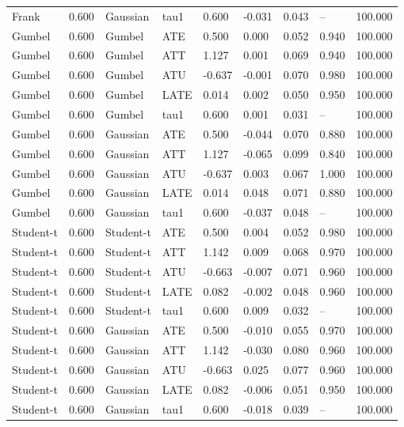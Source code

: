 \begin{table}[htbp]
\begin{tabular}{lllllllll}
Frank & 0.600 & Gaussian & tau1 & 0.600 & -0.031 & 0.043 & -- & 100.000 \\
Gumbel & 0.600 & Gumbel & ATE & 0.500 & 0.000 & 0.052 & 0.940 & 100.000 \\
Gumbel & 0.600 & Gumbel & ATT & 1.127 & 0.001 & 0.069 & 0.940 & 100.000 \\
Gumbel & 0.600 & Gumbel & ATU & -0.637 & -0.001 & 0.070 & 0.980 & 100.000 \\
Gumbel & 0.600 & Gumbel & LATE & 0.014 & 0.002 & 0.050 & 0.950 & 100.000 \\
Gumbel & 0.600 & Gumbel & tau1 & 0.600 & 0.001 & 0.031 & -- & 100.000 \\
Gumbel & 0.600 & Gaussian & ATE & 0.500 & -0.044 & 0.070 & 0.880 & 100.000 \\
Gumbel & 0.600 & Gaussian & ATT & 1.127 & -0.065 & 0.099 & 0.840 & 100.000 \\
Gumbel & 0.600 & Gaussian & ATU & -0.637 & 0.003 & 0.067 & 1.000 & 100.000 \\
Gumbel & 0.600 & Gaussian & LATE & 0.014 & 0.048 & 0.071 & 0.880 & 100.000 \\
Gumbel & 0.600 & Gaussian & tau1 & 0.600 & -0.037 & 0.048 & -- & 100.000 \\
Student-t & 0.600 & Student-t & ATE & 0.500 & 0.004 & 0.052 & 0.980 & 100.000 \\
Student-t & 0.600 & Student-t & ATT & 1.142 & 0.009 & 0.068 & 0.970 & 100.000 \\
Student-t & 0.600 & Student-t & ATU & -0.663 & -0.007 & 0.071 & 0.960 & 100.000 \\
Student-t & 0.600 & Student-t & LATE & 0.082 & -0.002 & 0.048 & 0.960 & 100.000 \\
Student-t & 0.600 & Student-t & tau1 & 0.600 & 0.009 & 0.032 & -- & 100.000 \\
Student-t & 0.600 & Gaussian & ATE & 0.500 & -0.010 & 0.055 & 0.970 & 100.000 \\
Student-t & 0.600 & Gaussian & ATT & 1.142 & -0.030 & 0.080 & 0.960 & 100.000 \\
Student-t & 0.600 & Gaussian & ATU & -0.663 & 0.025 & 0.077 & 0.960 & 100.000 \\
Student-t & 0.600 & Gaussian & LATE & 0.082 & -0.006 & 0.051 & 0.950 & 100.000 \\
Student-t & 0.600 & Gaussian & tau1 & 0.600 & -0.018 & 0.039 & -- & 100.000 \\
\hline\end{tabular}\end{table}
